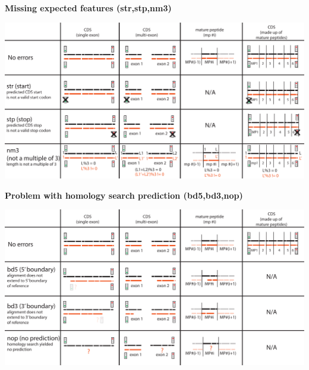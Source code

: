 \documentclass[landscape]{slides}
\begin{document}
\begin{slide}
\begin{center}
\textbf{Missing expected features (str,stp,nm3)}
\vspace{0.5in}

\includegraphics[width=10in]{figs/error-3-str-stp-nm3}
\end{center}
\vfill
\end{slide}
\begin{slide}
\begin{center}
\textbf{Problem with homology search prediction (bd5,bd3,nop)}
\vspace{0.5in}

\includegraphics[width=10in]{figs/error-4-bd5-bd3-nop}
\end{center}
\vfill
\end{slide}
\end{document}
